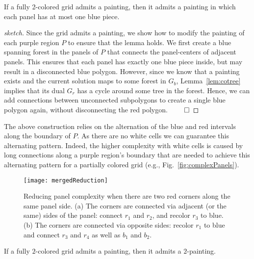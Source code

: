 \documentclass[runningheads]{llncs}
\begin{document}
\begin{lemma}\label{lem:semiregular}
If a fully 2-colored grid admits a painting, then it admits a painting in which each panel has at most one blue piece.
\end{lemma}
\begin{proof}[sketch]
    Since the grid admits a painting, we show how to modify the painting of each purple region $P$ to ensure that the lemma holds.
    We first create a blue spanning forest in the panels of $P$ that connects the panel-centers of adjacent panels.
    This ensures that each panel has exactly one blue piece inside, but may result in a disconnected blue polygon.
    However, since we know that a painting exists and the current solution maps to some forest in $G_b$, Lemma~\ref{lem:cotree} implies that its dual $G_r$ has a cycle around some tree in the forest.
    Hence, we can add connections between unconnected subpolygons to create a single blue polygon again, without disconnecting the red polygon.
	\hfill$\qed$
\end{proof}

    The above construction relies on the alternation of the blue and red intervals along the boundary of $P$.
    As there are no white cells we can guarantee this alternating pattern. 
    Indeed, the higher complexity with white cells is caused by long connections along a purple region's boundary that are needed to achieve this alternating pattern for a partially colored grid (e.g., Fig.~\ref{fig:complexPanels}).

	\begin{figure}[b]
		\centering
		\texttt{[image: mergedReduction]}
		\caption{Reducing panel complexity when there are two red corners along the same panel side. (a) The corners are connected via adjacent (or the same) sides of the panel: connect $r_1$ and $r_2$, and recolor $r_3$ to blue. (b) The corners are connected via opposite sides: recolor $r_1$ to blue and connect $r_3$ and $r_4$ as well as $b_1$ and $b_2$.}
		\label{fig:simplepainting1}
	\end{figure}

	
\begin{theorem}\label{the:2painting}
If a fully $2$-colored grid admits a painting, then it admits a $2$-painting.
\end{theorem}
\end{document}
